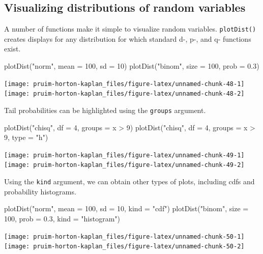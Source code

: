 \subsection{Visualizing distributions of random
variables}\label{visualizing-distributions-of-random-variables}

A number of functions make it simple to visualize random variables.
\texttt{plotDist()} creates displays for any distribution for which
standard d-, p-, and q- functions exist.

\begin{Schunk}
\begin{Sinput}
plotDist("norm", mean = 100, sd = 10)
plotDist("binom", size = 100, prob = 0.3)
\end{Sinput}


\begin{center}\texttt{[image: pruim-horton-kaplan\_files/figure-latex/unnamed-chunk-48-1]} \texttt{[image: pruim-horton-kaplan\_files/figure-latex/unnamed-chunk-48-2]} \end{center}

\end{Schunk}

\noindent
Tail probabilities can be highlighted using the \texttt{groups}
argument.

\begin{Schunk}
\begin{Sinput}
plotDist("chisq", df = 4, groups = x > 9)
plotDist("chisq", df = 4, groups = x > 9, type = "h")
\end{Sinput}


\begin{center}\texttt{[image: pruim-horton-kaplan\_files/figure-latex/unnamed-chunk-49-1]} \texttt{[image: pruim-horton-kaplan\_files/figure-latex/unnamed-chunk-49-2]} \end{center}

\end{Schunk}

\noindent
Using the \texttt{kind} argument, we can obtain other types of plots,
including cdfs and probability histograms.

\begin{Schunk}
\begin{Sinput}
plotDist("norm", mean = 100, sd = 10, kind = "cdf")
plotDist("binom", size = 100, prob = 0.3, kind = "histogram")
\end{Sinput}


\begin{center}\texttt{[image: pruim-horton-kaplan\_files/figure-latex/unnamed-chunk-50-1]} \texttt{[image: pruim-horton-kaplan\_files/figure-latex/unnamed-chunk-50-2]} \end{center}

\end{Schunk}

